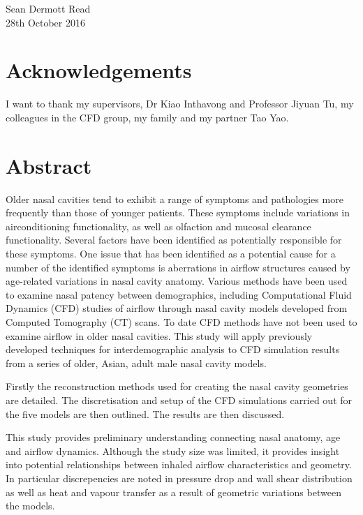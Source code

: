 \documentclass[12pt]{report}
\begin{document}
\vspace{0.3cm}
\noindent
Sean Dermott Read\\

\noindent
28th October 2016
\chapter*{Acknowledgements}
I want to thank my supervisors, Dr Kiao Inthavong and Professor Jiyuan Tu, my colleagues in the CFD group, my family and my partner Tao Yao. 

\tableofcontents

\newpage
\listoffigures
\listoftables

\chapter*{Abstract}
Older nasal cavities tend to exhibit a range of symptoms and pathologies more frequently than those of younger patients. These symptoms include variations in airconditioning functionality, as well as olfaction and mucosal clearance functionality. 
Several factors have been identified as potentially responsible for these symptoms. 
One issue that has been identified as a potential cause for a number of the identified symptoms is aberrations in airflow structures caused by age-related variations in nasal cavity anatomy. 
Various methods have been used to examine nasal patency between demographics, including Computational Fluid Dynamics (CFD) studies of airflow through nasal cavity models developed from Computed Tomography (CT) scans. 
To date CFD methods have not been used to examine airflow in older nasal cavities.
This study will apply previously developed techniques for interdemographic analysis to CFD simulation results from a series of older, Asian, adult male nasal cavity models.


Firstly the reconstruction methods used for creating the nasal cavity geometries are detailed.
The discretisation and setup of the CFD simulations carried out for the five models are then outlined.
The results are then discussed.


This study provides preliminary understanding connecting nasal anatomy, age and airflow dynamics. Although the study size was limited, it provides insight into potential relationships between inhaled airflow characteristics and geometry. In particular discrepencies are noted in pressure drop and wall shear distribution as well as heat and vapour transfer as a result of geometric variations between the models.
\end{document}
